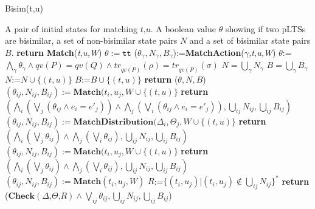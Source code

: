 \documentclass[a4paper,UKenglish,cleveref, autoref]{lipics-v2019}
\begin{document}
\begin{algorithm}[htbp]
\caption{Bisim(t,u)}
\label{alg:bisim}
\begin{algorithmic}[1]
\Require A pair of initial states for matching $t$,$u$.
\Ensure A boolean value $\theta$ showing if two pLTSs are bisimilar, a set of non-bisimilar state pairs $N$ and a set of bisimilar state pairs $B$.
\State \textbf{return} \textbf{Match}(\textit{t,u,W})
\EndFunction
\State
{}
    \State $\theta:=\texttt{tt}$
\Else
        \State ($\theta_{\gamma} ,N_{\gamma},B_{\gamma}$):=\textbf{MatchAction}(\textit{$\gamma$,t,u,W})
    \EndFor
    \State $\theta$:=$\bigwedge_\gamma\theta_\gamma\wedge qv(P)=qv(Q)\wedge tr_{\overline{qv(P)}}(\rho)=tr_{\overline{qv(P)}}(\sigma)$
    \State $N=\bigcup_{\gamma}N_\gamma$
    \State $B=\bigcup_{\gamma}B_\gamma$
     $N$:=$N\cup \{(t,u)\}$ 
     $B$:=$B\cup \{(t,u)\}$
    \EndIf
\EndIf
\State \textbf{return} ($\theta,N,B$) 
\EndFunction
\State
{}
\Switch{$\gamma$}
    \State $(\theta_{ij},N_{ij},B_{ij}):=\textbf{Match}(t_i,u_j,W\cup \{(t,u)\}$
\EndFor
\EndFor
\State \textbf{return} $(\bigwedge_{i}(\bigvee_j(\theta_{ij}\wedge e_i=e'_j))\wedge\bigwedge_{j}(\bigvee_i(\theta_{ij}\wedge e_i=e'_j)),\bigcup_{ij}N_{ij},\bigcup_{ij}B_{ij})$
\EndCase
\Case{$\tau$}
 
    \State $(\theta_{ij},N_{ij},B_{ij}):=\textbf{MatchDistribution}(\Delta_i,\Theta_j,W\cup \{(t,u)\}$
\EndFor
\EndFor
\State \textbf{return} $(\bigwedge_{i}(\bigvee_j\theta_{ij})\wedge\bigwedge_{j}(\bigvee_i\theta_{ij}),\bigcup_{ij}N_{ij},\bigcup_{ij}B_{ij})$
\EndCase
\Otherwise{}
    \State $(\theta_{ij},N_{ij},B_{ij}):=\textbf{Match}(t_i,u_j,W\cup \{(t,u)\}$
\EndFor
\EndFor
\State \textbf{return} $(\bigwedge_{i}(\bigvee_j\theta_{ij})\wedge\bigwedge_{j}(\bigvee_i\theta_{ij}),\bigcup_{ij}N_{ij},\bigcup_{ij}B_{ij})$
\EndOtherwise
\EndSwitch
\EndFunction
\State
{}
    \State $(\theta_{ij},N_{ij},B_{ij}):=\textbf{Match}(t_i,u_j,W)$
\EndFor
\State $\textit{R}$:=$\{(t_i,u_j)|(t_i,u_j)\notin \bigcup_{ij}N_{ij}\}^*$
\State \textbf{return} ($\textbf{Check}(\textit{$\Delta$,$\Theta$,$R$})\wedge\bigvee_{ij}\theta_{ij},\bigcup_{ij}N_{ij},\bigcup_{ij}B_{ij}$)
\EndFunction
\end{algorithmic}
\end{algorithm}
\end{document}
